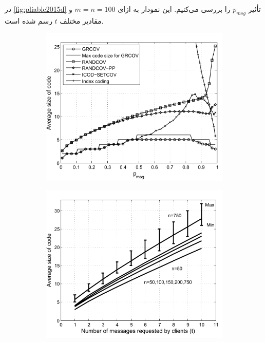 در
\autoref{fig:pliable2015d}
تأثیر
$p_{msg}$
را بررسی می‌کنیم. این نمودار به ازای
$m = n = 100$
و مقادیر مختلف
$t$
رسم شده است.
\begin{figure}
    \centering
    \begin{subfigure}[b]{0.45\textwidth}
        \centering
        \includegraphics[width=\textwidth]{figs/ch3/pliable2015_a}
        \caption{}
        \label{fig:pliable2015a}
    \end{subfigure}
    \hfill
    \begin{subfigure}[b]{0.45\textwidth}
        \centering
        \includegraphics[width=\textwidth]{figs/ch3/pliable2015_b}

\end{subfigure}
\end{figure}
